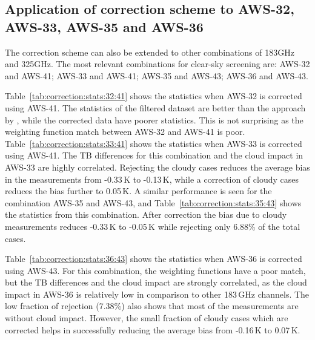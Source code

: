 \documentclass[12pt]{article}
\begin{document}
\subsection{Application of correction scheme to AWS-32, AWS-33, AWS-35 and AWS-36}
%
The correction scheme can also be extended to other combinations of 183GHz and
325GHz. The most relevant combinations for clear-sky screening are: AWS-32 and
AWS-41; AWS-33 and AWS-41; AWS-35 and AWS-43; AWS-36 and AWS-43.

Table~\ref{tab:correction:stats:32:41} shows the statistics when AWS-32 is
corrected using AWS-41. The statistics of the filtered dataset are better than
the approach by \cite{rekha2012potential}, while the corrected data have poorer
statistics. This is not surprising as the weighting function match between 
AWS-32 and  AWS-41 is poor. 
Table~\ref{tab:correction:stats:33:41} shows the statistics when AWS-33 is
corrected using AWS-41. The TB differences for this combination and the cloud
impact in AWS-33 are highly correlated. Rejecting the cloudy cases reduces the
average bias in the measurements from -0.33\,K to -0.13\,K, while a correction
of cloudy cases reduces the bias further to 0.05\,K. A similar performance is seen for the combination AWS-35 and AWS-43, and Table~\ref{tab:correction:stats:35:43} shows the statistics from this combination. After correction the bias due to cloudy measurements reduces -0.33\,K to -0.05\,K while rejecting only 6.88\% of the total cases.
 
Table~\ref{tab:correction:stats:36:43} shows the statistics when AWS-36 is corrected using AWS-43. For this combination, the weighting functions have a poor match, but the TB differences and the cloud impact are strongly correlated, as the cloud impact in AWS-36 is relatively low in comparison to other 183\,GHz channels. The low fraction of rejection (7.38\%) also shows that most of the measurements are without cloud impact. However, the small fraction of cloudy cases which are corrected helps in successfully reducing the average bias from -0.16\,K to 0.07\,K. 
\end{document}
